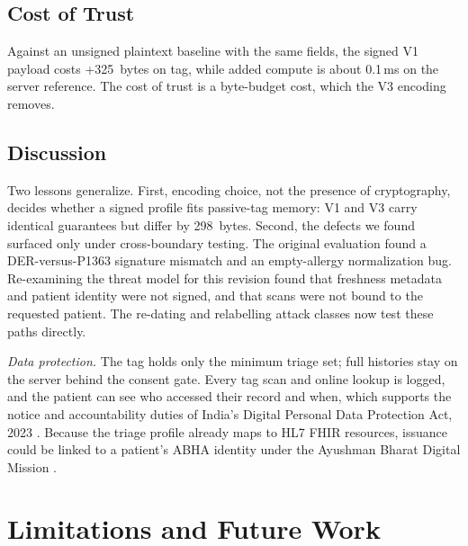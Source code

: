 \documentclass[conference]{IEEEtran}
\begin{document}


\subsection{Cost of Trust}
Against an unsigned plaintext baseline with the same fields, the signed V1 payload costs +325~bytes on tag, while added compute is about 0.1\,ms on the server reference. The cost of trust is a byte-budget cost, which the V3 encoding removes.

\subsection{Discussion}
Two lessons generalize. First, encoding choice, not the presence of cryptography, decides whether a signed profile fits passive-tag memory: V1 and V3 carry identical guarantees but differ by 298~bytes. Second, the defects we found surfaced only under cross-boundary testing. The original evaluation found a DER-versus-P1363 signature mismatch and an empty-allergy normalization bug. Re-examining the threat model for this revision found that freshness metadata and patient identity were not signed, and that scans were not bound to the requested patient. The re-dating and relabelling attack classes now test these paths directly.

\textit{Data protection.} The tag holds only the minimum triage set; full histories stay on the server behind the consent gate. Every tag scan and online lookup is logged, and the patient can see who accessed their record and when, which supports the notice and accountability duties of India's Digital Personal Data Protection Act, 2023 \cite{dpdp2023}. Because the triage profile already maps to HL7 FHIR resources, issuance could be linked to a patient's ABHA identity under the Ayushman Bharat Digital Mission \cite{abdm}.

\section{Limitations and Future Work}
\label{sec:limitations}
\end{document}
